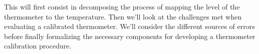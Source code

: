 \begin{bibunit}
  This will first consist in decomposing the process of mapping the level of the thermometer to the temperature. Then we'll look at the challenges met when evaluating a calibrated thermometer. We'll consider the different sources of errors before finally formalizing the necessary components for developing a thermometer calibration procedure.
%
%

\end{bibunit}
